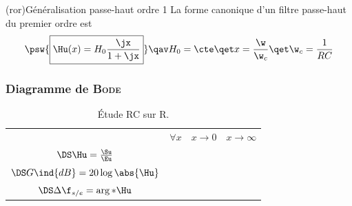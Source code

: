\documentclass[../../main/main.tex]{subfiles}
\begin{document}
\begin{tcb}(ror){Généralisation passe-haut ordre 1}
	La forme canonique d'un filtre passe-haut du premier ordre est
	\[
		\psw{%
			\boxed{\Hu(x) = H_0\frac{\jx}{1+\jx}}
		}%
		\qav
		H_0 = \cte
		\qet
		x = \frac{\w}{\w_c}
		\qet
		\w_c = \frac{1}{RC}
	\]
	\vspace{-15pt}
\end{tcb}

\subsubsection{Diagramme de \textsc{Bode}}
\begin{table}[htbp!]
	\centering
	\caption{Étude RC sur R.}
	\begin{tabularx}{\linewidth}{cYYY}
		\toprule
		 &
		$\forall x$
		 &
		$x\to 0$
		 &
		$x\to\infty$
		\\
		\addlinespace[0.5em]
		\cmidrule(lr){2-4}
		$\DS\Hu = \frac{\Su}{\Eu}$
		 &
		 &
		 &
		\\
		\addlinespace[0.5em]
		$\DS G\ind{dB} = 20 \log \abs{\Hu}$
		 &
		 &
		 &
		\\
		\addlinespace[0.5em]
		$\DS\Delta\f_{s/e} = \arg*{\Hu}$
		 &
		 &
		 &
		\\
		\bottomrule
	\end{tabularx}
	\label{tab:rcr}
\end{table}
\end{document}
